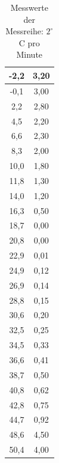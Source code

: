 \begin{table}
\begin{minipage}{0.45\textwidth}
\begin{tabular}{c|c}
-2,2	&3,20\\\hline
-0,1	&3,00\\\hline
2,2		&2,80\\\hline
4,5		&2,20\\\hline
6,6		&2,30\\\hline
8,3		&2,00\\\hline
10,0	&1,80\\\hline
11,8	&1,30\\\hline
14,0	&1,20\\\hline
16,3	&0,50\\\hline
18,7	&0,00\\\hline
20,8	&0,00\\\hline
22,9	&0,01\\\hline
24,9	&0,12\\\hline
26,9	&0,14\\\hline
28,8	&0,15\\\hline
30,6	&0,20\\\hline
32,5	&0,25\\\hline
34,5	&0,33\\\hline
36,6	&0,41\\\hline
38,7	&0,50\\\hline
40,8	&0,62\\\hline
42,8	&0,75\\\hline
44,7	&0,92\\\hline
48,6	&4,50\\\hline
50,4	&4,00\\\hline
\end{tabular}
\end{minipage}
\caption{Messwerte der Messreihe: $2^\circ$C pro Minute}
\label{tab_werte1}
\end{table}

